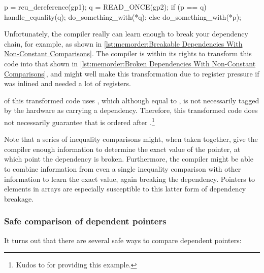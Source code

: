 {{\begin{listing}[tbp]
\begin{fcvlabel}
\begin{VerbatimL}[commandchars=\\\[\]]
p = rcu_dereference(gp1);		\lnlbl[p]
q = READ_ONCE(gp2);
if (p == q) {
	handle_equality(q);
	do_something_with(*q);		\lnlbl[q]
} else {
	do_something_with(*p);
}
\end{VerbatimL}
\end{fcvlabel}
\caption{Broken Dependencies With Non-Constant Comparisons}
\label{lst:memorder:Broken Dependencies With Non-Constant Comparisons}
\end{listing}%
%
	Unfortunately, the compiler really can learn enough to
	break your dependency chain, for example, as shown in
	\cref{lst:memorder:Breakable Dependencies With Non-Constant Comparisons}.
	The compiler is within its rights to transform this code
	into that shown in
	\cref{lst:memorder:Broken Dependencies With Non-Constant Comparisons},
	and might well make this transformation due to register pressure
	if  was inlined and needed a lot of registers.
	\begin{fcvref}
	 of this transformed code uses , which although
	equal to , is not necessarily tagged by the hardware as
	carrying a dependency.
	Therefore, this transformed code does not necessarily guarantee
	that  is ordered after .\footnote{
		Kudos to  for providing this example.}
	\end{fcvref}
}\QuickQuizEndE
}

Note that a series of inequality comparisons might, when taken together,
give the compiler enough information to determine the exact value of
the pointer, at which point the dependency is broken.
Furthermore, the compiler might be able to combine information from
even a single inequality comparison with other information to learn
the exact value, again breaking the dependency.
Pointers to elements in arrays are especially susceptible to this latter
form of dependency breakage.

\subsubsection{Safe comparison of dependent pointers}
It turns out that there are several safe ways to compare dependent
pointers:

